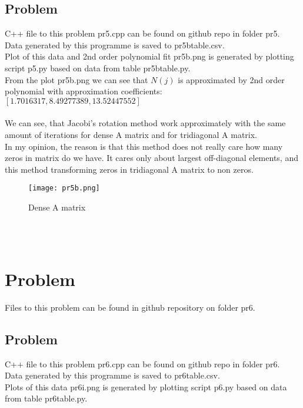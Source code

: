 \documentclass{article}
\begin{document}
\subsection{Problem}
C++ file to this problem pr5.cpp can be found on github repo in folder pr5.\\
Data generated by this programme is saved to pr5btable.csv.\\
Plot of this data and 2nd order polynomial fit pr5b.png is generated by plotting script p5.py based on data from table pr5btable.py.\\
From the plot pr5b.png we can see that $N(j)$ is approximated by 2nd order polynomial with approximation coefficients: $[1.7016317, 8.49277389, 13.52447552]$\\
\\
We can see, that Jacobi's rotation method work approximately with the same amount of iterations for dense A matrix and for tridiagonal A matrix.\\
In my opinion, the reason is that this method does not really care how many zeros in matrix do we have. It cares only about largest off-diagonal elements, and this method transforming zeros in tridiagonal A matrix to non zeros.
\begin{figure}
  \caption{Dense A matrix}
  \centering
    \texttt{[image: pr5b.png]}
\end{figure}
\\
\\
\section{Problem}
Files to this problem can be found in github repository on folder pr6.
\subsection{Problem}
C++ file to this problem pr6.cpp can be found on github repo in folder pr6.\\
Data generated by this programme is saved to pr6table.csv.\\
Plots of this data pr6i.png is generated by plotting script p6.py based on data from table pr6table.py.
\end{document}

